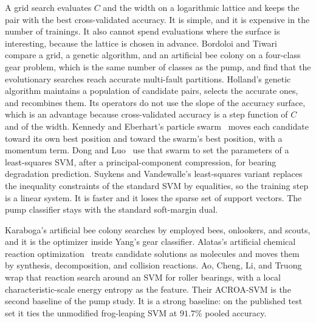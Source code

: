 A grid search evaluates \(C\) and the width on a logarithmic lattice and keeps the pair with the best cross-validated accuracy.
It is simple, and it is expensive in the number of trainings.
It also cannot spend evaluations where the surface is interesting, because the lattice is chosen in advance.
Bordoloi and Tiwari~\cite{bordoloi2014,holland1975} compare a grid, a genetic algorithm, and an artificial bee colony on a four-class gear problem, which is the same number of classes as the pump, and find that the evolutionary searches reach accurate multi-fault partitions.
Holland's genetic algorithm maintains a population of candidate pairs, selects the accurate ones, and recombines them.
Its operators do not use the slope of the accuracy surface, which is an advantage because cross-validated accuracy is a step function of \(C\) and of the width.
Kennedy and Eberhart's particle swarm~\cite{kennedy1995} moves each candidate toward its own best position and toward the swarm's best position, with a momentum term.
Dong and Luo~\cite{dong2013,suykens1999} use that swarm to set the parameters of a least-squares SVM, after a principal-component compression, for bearing degradation prediction.
Suykens and Vandewalle's least-squares variant replaces the inequality constraints of the standard SVM by equalities, so the training step is a linear system.
It is faster and it loses the sparse set of support vectors.
The pump classifier stays with the standard soft-margin dual.

Karaboga's artificial bee colony searches by employed bees, onlookers, and scouts, and it is the optimizer inside Yang's gear classifier.
Alatas's artificial chemical reaction optimization~\cite{alatas2011} treats candidate solutions as molecules and moves them by synthesis, decomposition, and collision reactions.
Ao, Cheng, Li, and Truong~\cite{ao2014} wrap that reaction search around an SVM for roller bearings, with a local characteristic-scale energy entropy as the feature.
Their ACROA-SVM is the second baseline of the pump study.
It is a strong baseline: on the published test set it ties the unmodified frog-leaping SVM at \(91.7\%\) pooled accuracy.

